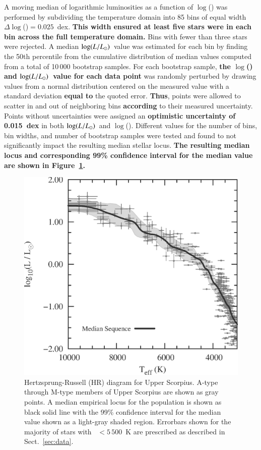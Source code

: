 \documentclass{aa}
\begin{document}
A moving median of logarithmic luminosities as a function of $\log$(\teff) was performed by subdividing the temperature domain into 85 bins of equal width $\Delta\log$(\teff)$ = 0.025$~dex. {\bf This width ensured at least five stars were in each bin across the full temperature domain.} Bins with fewer than three stars were rejected. A median $\log(L/L_{\odot})$\ value was estimated for each bin by finding the 50th percentile from the cumulative distribution of median values computed from a total of 10\,000 bootstrap samples. For each bootstrap sample, {\bf the $\log$(\teff) and $\log(L/L_{\odot})$\ value for each data point} was randomly perturbed by drawing values from a normal distribution centered on the measured value with a standard deviation {\bf equal to} the quoted error. {\bf Thus}, points were allowed to scatter in and out of neighboring bins {\bf according} to their measured uncertainty. Points without uncertainties were assigned an {\bf optimistic uncertainty of 0.015~dex} in both $\log(L/L_{\odot})$\ and $\log$(\teff). Different values for the number of bins, bin widths, and number of bootstrap samples were tested and found to not significantly impact the resulting median stellar locus. {\bf The resulting median locus and corresponding 99\% confidence interval for the median value are shown in Figure~\ref{fig:empirical}.}

\begin{figure}[t]
    \centering
    \includegraphics[width=0.85\linewidth]{USco_median_HRD.eps}
    \caption{Hertzsprung-Russell (HR) diagram for Upper Scorpius. A-type through M-type members of Upper Scorpius \citep{Preibisch1999,Preibisch2002,Pecaut2012} are shown as gray points. A median empirical locus for the population is shown as black solid line with the 99\% confidence interval for the median value shown as a light-gray shaded region. Errorbars shown for the majority of stars with \teff~$< 5\,500$~K are prescribed as described in Sect.~\ref{sec:data}.}
    \label{fig:empirical}
\end{figure}
\end{document}
